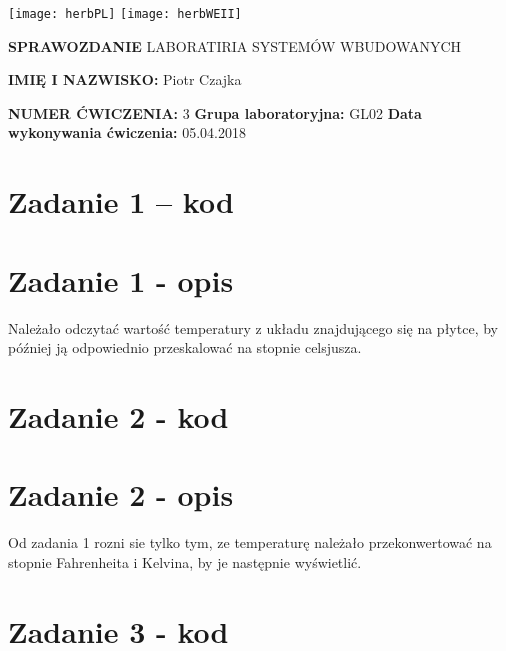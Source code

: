 \documentclass[12pt]{article}
\begin{document}
    \begin{center}
        \texttt{[image: herbPL]}
        \hspace{2cm}
        \texttt{[image: herbWEII]}
    \end{center}
    \centering
    {\Huge \textbf{SPRAWOZDANIE}}
    \vspace{0.5cm}
    \newline
    {\large LABORATIRIA SYSTEMÓW WBUDOWANYCH}
    \vfill
    \raggedright%
    \textbf{IMIĘ I NAZWISKO:} Piotr Czajka

    \newpage
    \textbf{NUMER ĆWICZENIA:} 3
    \newline
    \textbf{Grupa laboratoryjna:} GL02
    \newline
    \textbf{Data wykonywania ćwiczenia:} 05.04.2018
    \newline

    \newpage

    \tableofcontents

    \newpage

    \section{Zadanie 1 -- kod}%
    
    \newpage

    \section{Zadanie 1 - opis}%
    Należało odczytać wartość temperatury z układu znajdującego się na płytce, by później ją odpowiednio przeskalować na stopnie celsjusza.
    \newpage

    \section{Zadanie 2 - kod}%
    
    \newpage

    \section{Zadanie 2 - opis}%
    Od zadania 1 rozni sie tylko tym, ze temperaturę należało przekonwertować na stopnie Fahrenheita i Kelvina, by je następnie wyświetlić.
    \newpage

    \section{Zadanie 3 - kod}
    
    \newpage
\end{document}
